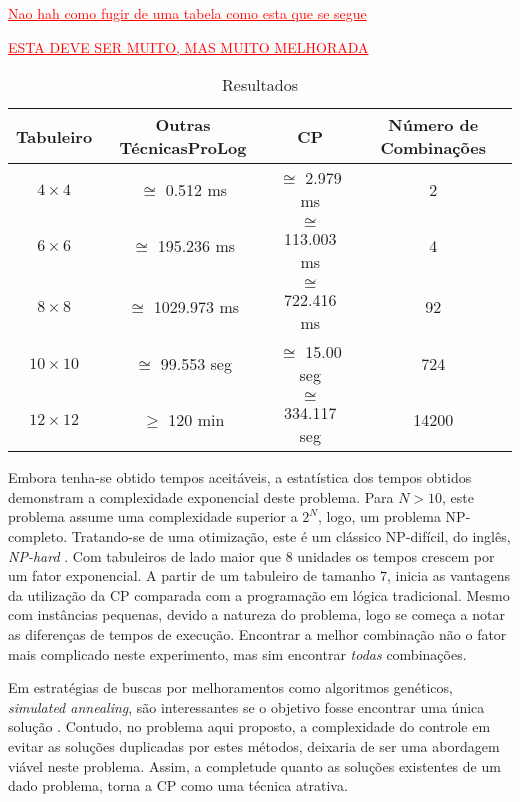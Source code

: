 \documentclass[12pt]{article}
\theoremstyle{definition}
\begin{document}
{\Large \textcolor{red}{\underline {Nao hah como 
fugir de uma tabela como esta que se segue}}}

{\Large \textcolor{red}{\underline { ESTA DEVE
SER MUITO, MAS MUITO MELHORADA}}}


\begin{table}[!ht]

\label{tab:Times}
\caption{Resultados}

\begin{center}
\begin{tabular}{c|c|c|c}
\hline \hline 
Tabuleiro & Outras TécnicasProLog & CP & Número de Combinações \\
\hline
\hline
$4 \times 4$ & $\cong$ 0.512 ms &  $\cong$ 2.979 ms & 2 \\
$6 \times 6$ & $\cong$ 195.236 ms & $\cong$ 113.003 ms & 4 \\
$8 \times 8$ &  $\cong$ 1029.973 ms & $\cong$ 722.416 ms & 92 \\
$10 \times 10$ & $\cong$ 99.553 seg & $\cong$ 15.00 seg & 724 \\
$12 \times 12$ & $\geq$ 120 min &  $\cong$ 334.117 seg & 14200 \\
\hline \hline 
\end{tabular}

\end{center}

\end{table}


Embora tenha-se obtido tempos aceitáveis, a estatística dos tempos obtidos demonstram a complexidade exponencial deste problema. Para $N > 10$, este problema assume uma complexidade superior a $2^N$, logo, um problema NP-completo. Tratando-se de uma otimização, este é um clássico NP-difícil, do inglês, {\em NP-hard} \cite{sipser_1996}. Com tabuleiros de lado maior que $8$ unidades os tempos crescem por um fator exponencial. A partir de um tabuleiro de tamanho $7$, inicia as vantagens da utilização da CP comparada com a programação em lógica tradicional. Mesmo com instâncias pequenas, devido a natureza do problema, logo se começa a notar as diferenças de tempos de execução. Encontrar a melhor combinação não o fator mais complicado neste experimento, 
mas sim encontrar {\em todas} combinações. 


Em estratégias de buscas por melhoramentos como algoritmos genéticos, {\em simulated annealing}, são interessantes se o objetivo fosse encontrar uma única solução \cite{RusNorv}. Contudo, no problema aqui proposto,  a complexidade do controle em evitar as soluções duplicadas por estes métodos, deixaria de ser uma abordagem viável neste problema. Assim, a completude quanto as soluções
existentes de um dado problema, torna a CP como uma técnica atrativa.
\end{document}
